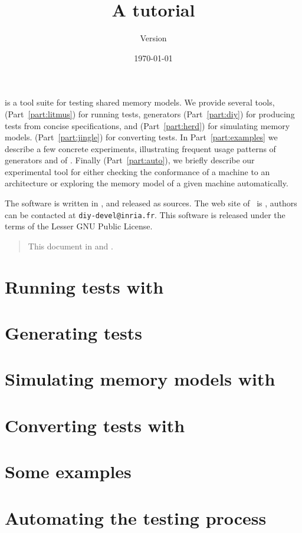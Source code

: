 \documentclass{article}
\title{A \prog{don't (diy)} tutorial}
\author{Version \version}
\date{\today}
\begin{document}
\maketitle

\diy{} is a tool suite for testing shared memory models.  We
provide several tools,  (Part~\ref{part:litmus}) for running tests,
\diy{} generators (Part~\ref{part:diy}) for producing tests from concise
specifications, and
\herd{} (Part~\ref{part:herd}) for simulating memory models.
\jingle{} (Part~\ref{part:jingle}) for converting tests.
In Part~\ref{part:examples} we describe
a few concrete experiments, illustrating frequent usage patterns of
\diy{} generators and of \litmus.
Finally (Part~\ref{part:auto}), we briefly
describe our experimental \dont{} tool
for either checking the
conformance of a machine to an architecture or exploring the memory model of a
given machine automatically.

The software is written in
, and released as
sources.  The web site of~\diy{} is
, authors can be contacted at
\texttt{diy-devel@inria.fr}.
This software is released under the terms of the Lesser GNU Public License.

\begin{htmlonly}
\begin{quote}
This document in  and .
\end{quote}
\end{htmlonly}

\tableofcontents
\cutend

\clearpage
\part{Running\label{part:litmus} tests with }


\clearpage
\part{Generating\label{part:diy} tests}


\clearpage
\part{Simulating\label{part:herd} memory models with \herd}


\clearpage
\part{Converting\label{part:jingle} tests with \jingle}


\clearpage
\part{Some \label{part:examples} examples}


\clearpage
\part{Automating\label{part:auto} the testing process}




\end{document}
